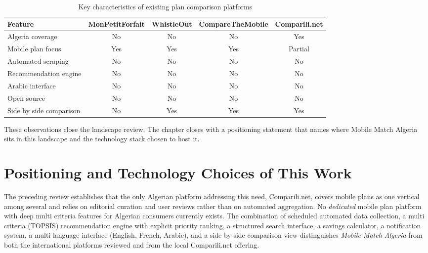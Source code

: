 \begin{table}[H]
  \caption{Key characteristics of existing plan comparison platforms}
  \label{tab:platform-comparison}
  \centering\small
  \begin{tabular}{|l|c|c|c|c|}
    \hline
    \textbf{Feature} & \textbf{MonPetitForfait} & \textbf{WhistleOut} & \textbf{CompareTheMobile} & \textbf{Comparili.net} \\
    \hline
    Algeria coverage        & No  & No  & No  & Yes     \\
    \hline
    Mobile plan focus       & Yes & Yes & Yes & Partial \\
    \hline
    Automated scraping      & No  & No  & No  & No      \\
    \hline
    Recommendation engine   & No  & No  & No  & No      \\
    \hline
    Arabic interface        & No  & No  & No  & No      \\
    \hline
    Open source             & No  & No  & No  & No      \\
    \hline
    Side by side comparison & No  & Yes & Yes & Yes     \\
    \hline
  \end{tabular}
\end{table}

These observations close the landscape review. The chapter closes with a positioning statement that names where Mobile Match Algeria sits in this landscape and the technology stack chosen to host it.

\section{Positioning and Technology Choices of This Work}

The preceding review establishes that the only Algerian platform addressing this need, Comparili.net, covers mobile plans as one vertical among several and relies on editorial curation and user reviews rather than on automated aggregation. No \emph{dedicated} mobile plan platform with deep multi criteria features for Algerian consumers currently exists. The combination of scheduled automated data collection, a multi criteria (TOPSIS) recommendation engine with explicit priority ranking, a structured search interface, a savings calculator, a notification system, a multi language interface (English, French, Arabic), and a side by side comparison view distinguishes \textit{Mobile Match Algeria} from both the international platforms reviewed and from the local Comparili.net offering.

